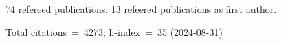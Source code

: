 74 refereed publications. 13 refeered publications as first author.

Total citations~=~4273; h-index~=~35 (2024-08-31)